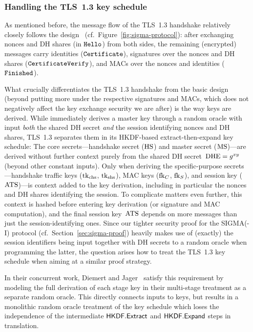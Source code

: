 \subsubsection*{Handling the TLS~1.3 key schedule\lncsdot}
\fi

\iffull
As mentioned before, the message flow of the TLS~1.3 handshake relatively closely follows the \SIGMAI design~\cite{C:Krawczyk03,SIGMA-fullversion} (cf.\ Figure~\ref{fig:sigma-protocol}):
after exchanging nonces and DH shares (in $\mathtt{Hello}$) from both sides, the remaining (encrypted) messages carry identities ($\mathtt{Certificate}$), signatures over the nonces and DH shares ($\mathtt{CertificateVerify}$), and MACs over the nonces and identities ($\mathtt{Finished}$).

What crucially differentiates the TLS~1.3 handshake from the basic \SIGMAI design (beyond putting more under the respective signatures and MACs, which does not negatively affect the key exchange security we are after) is the way keys are derived.
While \SIGMAI immediately derives a master key through a random oracle with input \emph{both} the shared DH secret \emph{and} the session identifying nonces and DH shares,
TLS~1.3 separates them in its HKDF-based extract-then-expand key schedule:
The core secrets---handshake secret ($\mathrm{HS}$) and master secret ($\mathrm{MS}$)---are derived without further context purely from the shared DH secret~$\mathrm{DHE} = g^{xy}$ (beyond other constant inputs).
Only when deriving the specific-purpose secrets---handshake traffic keys ($\mathrm{tk}_{\text{chs}}$, $\mathrm{tk}_{\text{shs}}$), MAC keys ($\mathrm{fk}_C$, $\mathrm{fk}_S$), and session key ($\mathrm{ATS}$)---is context added to the key derivation, including in particular the nonces and DH shares identifying the session.
To complicate matters even further, this context is hashed before entering key derivation (or signature and MAC computation), and the final session key~$\mathrm{ATS}$ depends on more messages than just the session-identifying ones.
Since our tighter security proof for the SIGMA(-I) protocol (cf.\ Section~\ref{sec:sigma-proof}) heavily makes use of (exactly) the session identifiers being input together with DH secrets to a random oracle when programming the latter,
the question arises how to treat the TLS~1.3 key schedule when aiming at a similar proof strategy.

In their concurrent work, Diemert and Jager~\cite{JC:DieJag20} satisfy this requirement by modeling the full derivation of each stage key in their multi-stage treatment as a separate random oracle.
This directly connects inputs to keys, but results in a monolithic random oracle treatment of the key schedule which loses the independence of the intermediate $\mathsf{HKDF}.\mathsf{Extract}$ and $\mathsf{HKDF}.\mathsf{Expand}$ steps in translation.

